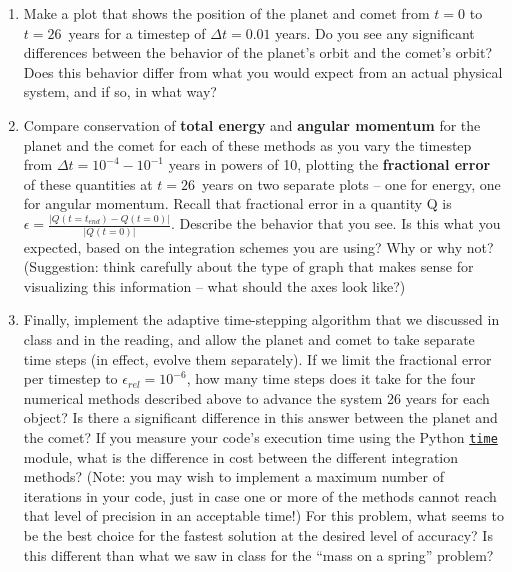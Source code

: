 \documentclass[10pt]{article}
\begin{document}
\begin{enumerate}

\item Make a plot that shows the position of the planet and comet from
  $t=0$ to $t=26$~years for a timestep of $\Delta t=0.01$
  years.  Do you see any significant differences between the behavior
  of the planet's orbit and the comet's orbit?  Does this behavior
  differ from what you would expect from an actual physical system,
  and if so, in what way?

\item
Compare conservation of \textbf{total energy} and \textbf{angular
  momentum} for the planet and the comet for each of these
methods as you vary the timestep from $\Delta t = 10^{-4} - 10^{-1}$ years in
powers of 10, plotting the \textbf{fractional error} of these quantities at $t =
26$~years on two separate plots -- one for
energy, one for angular momentum.   Recall that fractional error in a
quantity Q is $\epsilon = \frac{|Q(t = t_{end}) -Q(t=0)|}{|Q(t=0)|}$.
Describe the behavior that you see.  Is this what you expected, based
on the integration schemes you are using?  Why or why not?
(Suggestion: think carefully about the type of graph that makes sense
for visualizing this information -- what should the axes look like?)

\item Finally, implement the adaptive time-stepping algorithm that we
discussed in class and in the reading, and allow the planet and comet to take separate
time steps (in effect, evolve them separately).  If we limit the
fractional error per timestep to $\epsilon_{rel} = 10^{-6}$, how many
time steps does it take for the four numerical methods described above
to advance the system 26 years for each object?  Is there a significant difference in
this answer between the planet and the comet?  If you measure your code's
execution time using the Python
\href{https://docs.python.org/3/library/time.html}{\texttt{time}}
module, what is the difference in cost between the different integration methods?  (Note:
you may wish to implement a maximum number of iterations in your code,
just in case one or more of the methods cannot reach that level of
precision in an acceptable time!)
For this problem, what seems to be the best choice for the fastest
solution at the desired level of accuracy?  Is this different than
what we saw in class for the ``mass on a spring'' problem?

\end{enumerate}
\end{document}
